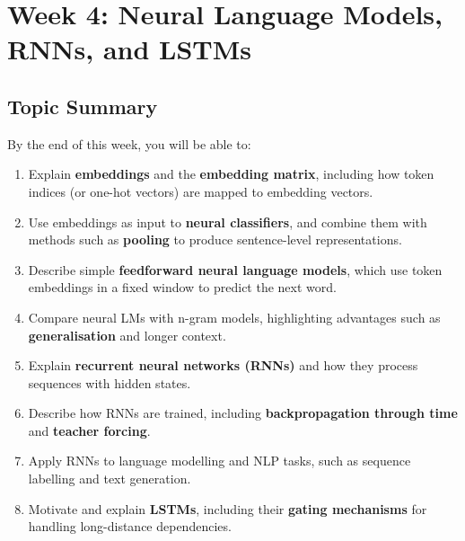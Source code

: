 \section{Week 4: Neural Language Models, RNNs, and LSTMs}

\subsection{Topic Summary}

\begin{keybox}
By the end of this week, you will be able to:
\begin{enumerate}
  \item Explain \textbf{embeddings} and the \textbf{embedding matrix}, including how token indices (or one-hot vectors) are mapped to embedding vectors.
  \item Use embeddings as input to \textbf{neural classifiers}, and combine them with methods such as \textbf{pooling} to produce sentence-level representations.
  \item Describe simple \textbf{feedforward neural language models}, which use token embeddings in a fixed window to predict the next word.
  \item Compare neural LMs with n-gram models, highlighting advantages such as \textbf{generalisation} and longer context.
  \item Explain \textbf{recurrent neural networks (RNNs)} and how they process sequences with hidden states.
  \item Describe how RNNs are trained, including \textbf{backpropagation through time} and \textbf{teacher forcing}.
  \item Apply RNNs to language modelling and NLP tasks, such as sequence labelling and text generation.
  \item Motivate and explain \textbf{LSTMs}, including their \textbf{gating mechanisms} for handling long-distance dependencies.
\end{enumerate}
\end{keybox}

